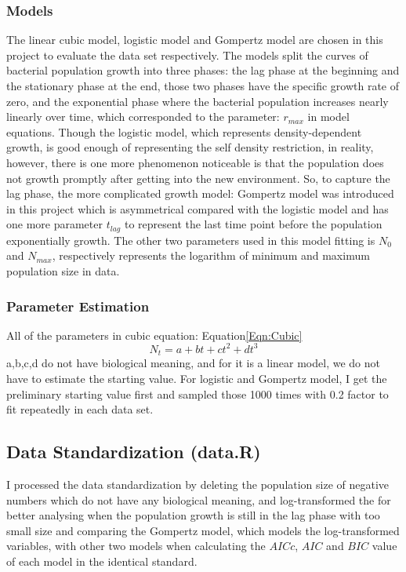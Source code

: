 \documentclass[11pt, a4paper]{article}
\begin{document}
\subsubsection{Models}
The linear cubic model, logistic model and Gompertz model\citep{zwietering1990modeling} are chosen in this project to evaluate the data set respectively. The models split the curves of bacterial population growth into three phases: the lag phase at the beginning and the stationary phase at the end, those two phases have the specific growth rate of zero, and the exponential phase where the bacterial population increases nearly linearly over time, which corresponded to the parameter: $r_{max}$ in model equations. Though the logistic model, which represents density-dependent growth\citep{eberhardt2008analyzing}, is good enough of representing the self density restriction, in reality, however, there is one more phenomenon noticeable is that the population does not growth promptly after getting into the new environment. So, to capture the lag phase, the more complicated growth model: Gompertz model was introduced in this project which is asymmetrical compared with the logistic model and has one more parameter $t_{lag}$ to represent the last time point before the population exponentially growth. The other two parameters used in this model fitting is $N_0$ and $N_{max}$, respectively represents the logarithm of minimum and maximum population size in data.

\subsubsection{Parameter Estimation}
All of the parameters in cubic equation: Equation\ref{Eqn:Cubic} \begin{equation} \label{Eqn:Cubic}
    N_t = a + bt + ct^2 + dt^3
\end{equation} a,b,c,d do not have biological meaning, and for it is a linear model, we do not have to estimate the starting value. For logistic and Gompertz model, I get the preliminary starting value first and sampled those 1000 times with 0.2 factor to fit repeatedly in each data set.

\subsection{Data Standardization (data.R)}
 I processed the data standardization by deleting the population size of negative numbers which do not have any biological meaning, and log-transformed the for better analysing when the population growth is still in the lag phase with too small size and comparing the Gompertz model, which models the log-transformed variables, with other two models when calculating the $AICc$, $AIC$ and $BIC$ value of each model in the identical standard.
\end{document}
